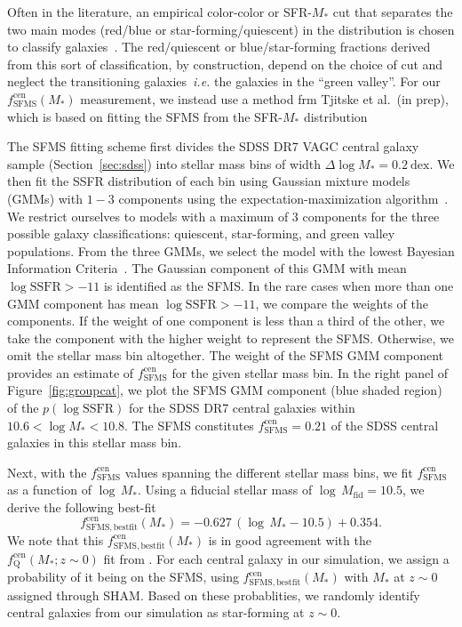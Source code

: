 \documentclass[12pt, letterpaper, preprint]{aastex}
\newcommand{\beq}{\begin{equation}}
\newcommand{\eeq}{\end{equation}}
\begin{document}
Often in the literature, an empirical color-color or SFR-$M_*$ cut 
that separates the two main modes (red/blue or star-forming/quiescent) 
in the distribution is chosen to classify 
galaxies~\citep[\emph{e.g.}][]{baldry2006, blanton2009, drory2009, peng2010, moustakas2013, hahn2015}.
The red/quiescent or blue/star-forming fractions derived from this sort of 
classification, by construction, depend on the choice of cut and neglect the 
transitioning galaxies~\emph{i.e.} the galaxies in the ``green valley''. 
For our $f^\mathrm{cen}_\mathrm{SFMS}(M_*)$ measurement, we instead use a
method frm Tjitske et al.~(in prep), which is based on fitting the 
SFMS from the SFR-$M_*$ distribution 

The SFMS fitting scheme first divides the SDSS DR7 VAGC central 
galaxy sample (Section~\ref{sec:sdss}) into stellar mass bins of 
width $\Delta \log M_* = 0.2~\mathrm{dex}$. We then fit the SSFR 
distribution of each bin using Gaussian mixture models (GMMs) with 
$1 - 3$ components using the expectation-maximization 
algorithm~\citep[EM;][]{dempster1977, neal1998}. We restrict 
ourselves to models with a maximum of $3$ components for the three 
possible galaxy classifications: quiescent, star-forming, and green 
valley populations. From the three GMMs, we select the model with 
the lowest Bayesian Information Criteria~\citep[BIC][]{schwarz1978}. 
The Gaussian component of this GMM with mean $\log \mathrm{SSFR} > -11$ 
is identified as the SFMS. In the rare cases when more than one GMM 
component has mean $\log \mathrm{SSFR} > -11$, we compare the weights 
of the components.  If the weight of one component is less than a 
third of the other, we take the component with the higher weight to 
represent the SFMS. Otherwise, we omit the stellar mass bin altogether. 
The weight of the SFMS GMM component provides an estimate of 
$f^\mathrm{cen}_\mathrm{SFMS}$ for the given stellar mass bin. 
In the right panel of Figure~\ref{fig:groupcat}, we plot the SFMS 
GMM component (blue shaded region) of the $p(\log \mathrm{SSFR})$ 
for the SDSS DR7 central galaxies within $10.6 < \log M_* < 10.8$. 
The SFMS constitutes $f^\mathrm{cen}_\mathrm{SFMS} = 0.21$ of the 
SDSS central galaxies in this stellar mass bin. 

Next, with the $f^\mathrm{cen}_\mathrm{SFMS}$ values spanning 
the different stellar mass bins, we fit $f^\mathrm{cen}_\mathrm{SFMS}$ as 
a function of $\log\,M_*$. Using a fiducial stellar mass of 
$\log\,M_\mathrm{fid} = 10.5$, we derive the following best-fit 
\beq \label{eq:f_cen_sfms}
f^\mathrm{cen}_\mathrm{SFMS, bestfit}(M_*) = -0.627\,(\log\,M_* - 10.5) + 0.354. 
\eeq
We note that this $f^\mathrm{cen}_\mathrm{SFMS, bestfit}(M_*)$ is 
in good agreement with the $f_\mathrm{Q}^\mathrm{cen}(M_*; z\sim0)$ 
fit from \cite{hahn2017a}. For each central galaxy in our simulation, 
we assign a probability of it being on the SFMS, using 
$f^\mathrm{cen}_\mathrm{SFMS, bestfit}(M_*)$ with $M_*$ at $z \sim 0$ 
assigned through SHAM. Based on these probablities, we randomly 
identify central galaxies from our simulation as star-forming at 
$z \sim 0$.
\end{document}
